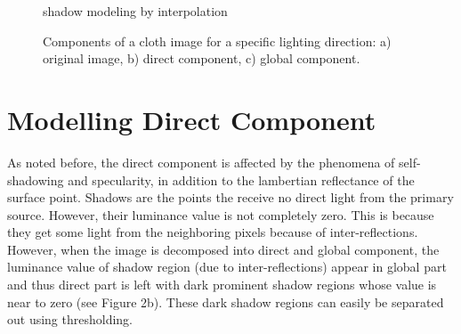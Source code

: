 \begin{figure}[t]
\centering
{}
\caption{shadow modeling by interpolation}
\end{figure}
\begin{center}
\begin{figure}[t]
\centering
{}
 \caption{Components of a cloth image for a specific
lighting direction: a) original image, b) direct component, c) global
component.} \label{fig:subfigureExample}
\end{figure}
\end{center}
\section{Modelling Direct Component}

As noted before, the direct component is affected by the phenomena of
self-shadowing and specularity, in addition to the lambertian reflectance of the
surface point. Shadows are the points the receive no direct light from the
primary source. However, their luminance value is not completely zero. This is
because they get some light from the neighboring pixels because of
inter-reflections. However, when the image is decomposed into direct and global
component, the luminance value of shadow region (due to inter-reflections)
appear in global part and thus direct part is left with dark prominent shadow
regions whose value is near to zero (see Figure 2b). These dark shadow regions
can easily be separated out using thresholding.

